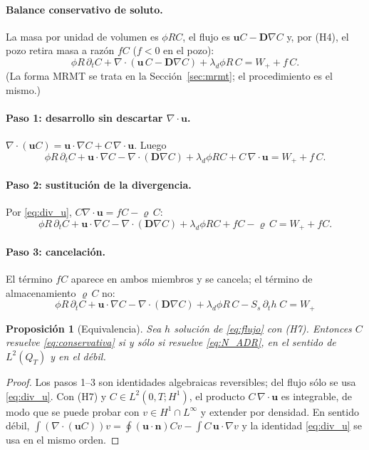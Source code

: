 \documentclass[11pt]{article}
\numberwithin{equation}{section}
\newtheorem{proposition}{Proposición}
\theoremstyle{remark}
\newcommand{\bu}{\mathbf{u}}
\newcommand{\bD}{\mathbf{D}}
\newcommand{\bn}{\mathbf{n}}
\newcommand{\vr}{\varrho}              %
\begin{document}
\paragraph{Balance conservativo de soluto.} La masa por unidad de volumen es $\phi RC$, el flujo
es $\bu C-\bD\nabla C$ y, por (H4), el pozo retira masa a raz\'on $fC$ ($f<0$ en el pozo):
\begin{equation}
\phi R\,\partial_tC+\nabla\!\cdot(\bu\,C-\bD\nabla C)+\lambda_d\phi R\,C=W_++f\,C .
\label{eq:conservativa}
\end{equation}
(La forma MRMT se trata en la Secci\'on~\ref{sec:mrmt}; el procedimiento es el mismo.)

\paragraph{Paso 1: desarrollo sin descartar $\nabla\!\cdot\bu$.}
$\nabla\!\cdot(\bu C)=\bu\cdot\nabla C+C\,\nabla\!\cdot\bu$. Luego
\begin{equation}
\phi R\,\partial_tC+\bu\cdot\nabla C-\nabla\!\cdot(\bD\nabla C)+\lambda_d\phi RC+C\,\nabla\!\cdot\bu=W_++f\,C.
\label{eq:desarrollada}
\end{equation}

\paragraph{Paso 2: sustituci\'on de la divergencia.} Por \eqref{eq:div_u}, $C\nabla\!\cdot\bu=fC-\vr\,C$:
\begin{equation}
\phi R\,\partial_tC+\bu\cdot\nabla C-\nabla\!\cdot(\bD\nabla C)+\lambda_d\phi RC+fC-\vr\,C=W_++fC .
\end{equation}

\paragraph{Paso 3: cancelaci\'on.} El t\'ermino $fC$ aparece en ambos miembros y se cancela;
el t\'ermino de almacenamiento $\vr\,C$ no:
\begin{equation}
\boxed{\ \phi R\,\partial_tC+\bu\cdot\nabla C-\nabla\!\cdot(\bD\nabla C)+\lambda_d\phi R\,C-S_s\,\partial_th\;C=W_+\ }
\label{eq:N_ADR}
\end{equation}

\begin{proposition}[Equivalencia]\label{prop:equiv}
Sea $h$ soluci\'on de \eqref{eq:flujo} con (H7). Entonces $C$ resuelve \eqref{eq:conservativa} si y s\'olo si
resuelve \eqref{eq:N_ADR}, en el sentido de $L^2(Q_T)$ y en el d\'ebil.
\end{proposition}
\begin{proof}
Los pasos 1--3 son identidades algebraicas reversibles; del flujo s\'olo se usa \eqref{eq:div_u}.
Con (H7) y $C\in L^2(0,T;H^1)$, el producto $C\,\nabla\!\cdot\bu$ es integrable, de modo que se puede probar con $v\in H^1\cap L^\infty$ y extender por densidad.
En sentido d\'ebil, $\int(\nabla\!\cdot(\bu C))v=\oint(\bu\cdot\bn)Cv-\int C\,\bu\cdot\nabla v$ y la identidad \eqref{eq:div_u} se usa en el mismo orden.
\end{proof}
\end{document}
